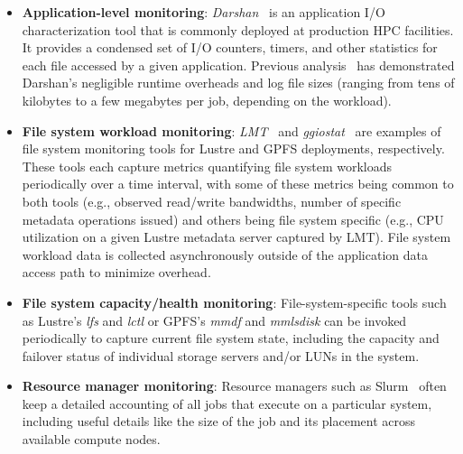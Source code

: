 \begin{itemize}[leftmargin=*]
\item \textbf{Application-level monitoring}: \textit{Darshan}~\cite{Carns2009} is an application I/O characterization tool that is commonly deployed at production HPC facilities. It provides a condensed set of I/O counters, timers, and other statistics for each file accessed by a given application. Previous analysis~\cite{snyder2016performance} has demonstrated Darshan's negligible runtime overheads and log file sizes (ranging from tens of kilobytes to a few megabytes per job, depending on the workload).

\item \textbf{File system workload monitoring}: \textit{LMT}~\cite{lmt} and \textit{ggiostat}~\cite{Lockwood2017} are examples of 
file system monitoring tools for Lustre and GPFS deployments, respectively.
These tools each capture metrics quantifying file system workloads periodically over a time interval, with some of these metrics being common to both tools (e.g., observed read/write bandwidths, number of specific metadata operations issued) and others being file system specific (e.g., CPU utilization on a given Lustre metadata server captured by LMT).
File system workload data is collected asynchronously outside of the application data access path to minimize overhead.

\item \textbf{File system capacity/health monitoring}: File-system-specific tools such as Lustre's \textit{lfs} and \textit{lctl} or GPFS's \textit{mmdf} and \textit{mmlsdisk} can be invoked periodically to capture current file system state, including the capacity and failover status of individual storage servers and/or LUNs in the system.

\item \textbf{Resource manager monitoring}: Resource managers such as Slurm~\cite{2003slurm} often keep a detailed accounting of all jobs that execute on a particular system, including useful details like the size of the job and its placement across available compute nodes.
\end{itemize}

